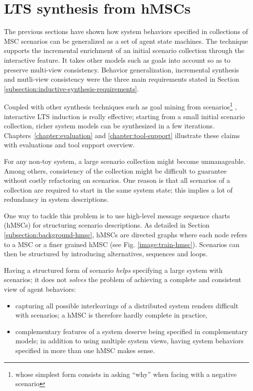 \section{LTS synthesis from hMSCs\label{section:inductive-from-hMSC}}

The previous sections have shown how system behaviors specified in collections of MSC scenarios can be generalized as a set of agent state machines. The technique supports the incremental enrichment of an initial scenario collection through the interactive feature. It takes other models such as goals into account so as to preserve multi-view consistency. Behavior generalization, incremental synthesis and mutli-view consistency were the three main requirements stated in Section \ref{subsection:inductive-synthesis-requirements}. 

Coupled with other synthesis techniques such as goal mining from scenarios\footnote{whose simplest form consists in asking ``why'' when facing with a negative scenario} \cite{Damas:2006}, interactive LTS induction is really effective; starting from a small initial scenario collection, richer system models can be synthesized in a few iterations. Chapters~\ref{chapter:evaluation} and \ref{chapter:tool-support} illustrate these claims with evaluations and tool support overview.

For any non-toy system, a large scenario collection might become unmanageable. Among others, consistency of the collection might be difficult to guarantee without costly refactoring on scenarios. One reason is that all scenarios of a collection are required to start in the same system state; this implies a lot of redundancy in system descriptions.

One way to tackle this problem is to use high-level message sequence charts (hMSCs) for structuring scenario descriptions. As detailed in Section \ref{subsection:background-hmsc}, hMSCs are directed graphs where each node refers to a MSC or a finer grained hMSC (see Fig. \ref{image:train-hmsc}). Scenarios can then be structured by introducing alternatives, sequences and loops.

Having a structured form of scenario \emph{helps} specifying a large system with scenarios; it does not \emph{solves} the problem of achieving a complete and consistent view of agent behaviors:
\begin{itemize}
\item capturing all possible interleavings of a distributed system renders difficult with scenarios; a hMSC is therefore hardly complete in practice,
\item complementary features of a system deserve being specified in complementary models; in addition to using multiple system views, having system behaviors specified in more than one hMSC makes sense.
\end{itemize}

